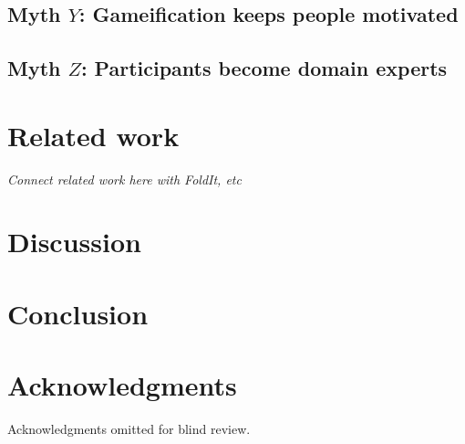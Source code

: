 \documentclass{sigchi}
\begin{document}
\subsection{Myth $Y$: Gameification keeps people motivated}

\subsection{Myth $Z$: Participants become domain experts}


\section{Related work}

\emph{Connect related work here with FoldIt, etc}

\section{Discussion}

\section{Conclusion}

\section{Acknowledgments}
Acknowledgments omitted for blind review.

\balance



\end{document}
